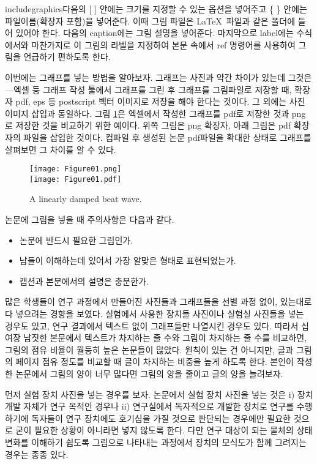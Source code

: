 \documentclass{gshs_thesis}
\begin{document}
includegraphics다음의 [ ] 안에는 크기를 지정할 수 있는 옵션을 넣어주고 \{ \} 안에는 파일이름(확장자 포함)을 넣어준다. 이때 그림 파일은 \LaTeX\ 파일과 같은 폴더에 들어 있어야 한다. 다음의 caption에는 그림 설명을 넣어준다. 마지막으로 label에는 수식에서와 마찬가지로 이 그림의 라벨을 지정하여 본문 속에서 ref 명령어를 사용하여 그림을 언급하기 편하도록 한다.

이번에는 그래프를 넣는 방법을 알아보자. 그래프는 사진과 약간 차이가 있는데 그것은---엑셀 등 그래프 작성 툴에서 그래프를 그린 후 그래프를 그림파일로 저장할 때, 확장자 pdf, eps 등 postscript 벡터 이미지로 저장을 해야 한다는 것이다. 그 외에는 사진 이미지 삽입과 동일하다. 그림 \ref{Fig01}은 엑셀에서 작성한 그래프를 pdf로 저장한 것과 png로 저장한 것을 비교하기 위한 예이다. 위쪽 그림은 png 확장자, 아래 그림은 pdf 확장자의 파일을 삽입한 것이다. 컴파일 후 생성된 논문 pdf파일을 확대한 상태로 그래프를 살펴보면 그 차이를 알 수 있다.


\begin{figure}[t]
\begin{center}
\texttt{[image: Figure01.png]}\\
\texttt{[image: Figure01.pdf]}
\caption{A linearly damped beat wave.} \label{Fig01}
\end{center}
\end{figure}

논문에 그림을 넣을 때 주의사항은 다음과 같다.
\begin{itemize}
\item{논문에 반드시 필요한 그림인가.}
\item{남들이 이해하는데 있어서 가장 알맞은 형태로 표현되었는가.}
\item{캡션과 본문에서의 설명은 충분한가.}
\end{itemize}
많은 학생들이 연구 과정에서 만들어진 사진들과 그래프들을 선별 과정 없이, 있는대로 다 넣으려는 경향을 보였다. 실험에서 사용한 장치들 사진이나 실험실 사진들을 넣는 경우도 있고, 연구 결과에서 텍스트 없이 그래프들만 나열시킨 경우도 있다. 따라서 십여장 남짓한 본문에서 텍스트가 차지하는 줄 수와 그림이 차지하는 줄 수를 비교하면, 그림의 점유 비율이 월등히 높은 논문들이 많았다. 원칙이 있는 건 아니지만, 글과 그림의 페이지 점유 정도를 비교할 때 글이 차지하는 비중을 높게 하도록 한다. 본인이 작성한 논문에서 그림의 양이 너무 많다면 그림의 양을 줄이고 글의 양을 늘려보자.

먼저 실험 장치 사진을 넣는 경우를 보자. 논문에서 실험 장치 사진을 넣는 것은 i) 장치 개발 자체가 연구 목적인 경우나 ii) 연구실에서 독자적으로 개발한 장치로 연구를 수행하기에 독자들이 연구 장치에도 호기심을 가질 것으로 판단되는 경우에만 필요한 것으로 굳이 필요한 상황이 아니라면 넣지 않도록 한다. 다만 연구 대상이 되는 물체의 상태 변화를 이해하기 쉽도록 그림으로 나타내는 과정에서 장치의 모식도가 함께 그려지는 경우는 종종 있다.
\end{document}
